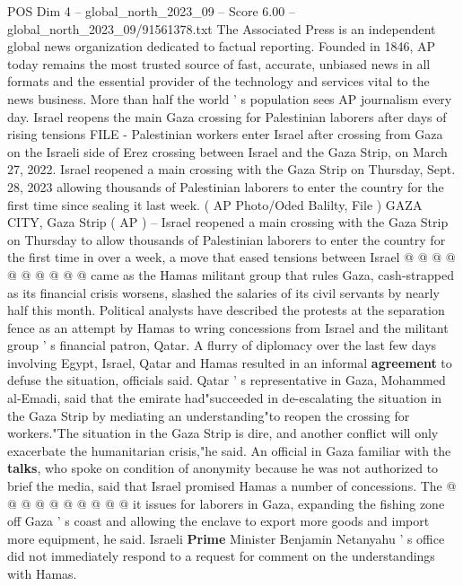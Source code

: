 \begin{textsample}{POS Dim 4 – global\_north\_2023\_09 – Score 6.00 – global\_north\_2023\_09/91561378.txt}  \label{ex:f4_pos_416}
The Associated Press is an independent global news organization dedicated to factual reporting.
Founded in 1846, AP today remains the most trusted source of fast, accurate, unbiased news in all formats and the essential provider of the technology and services vital to the news business.
More than half the world ' s population sees AP journalism every day.
Israel reopens the main Gaza crossing for Palestinian laborers after days of rising tensions FILE - Palestinian workers enter Israel after crossing from Gaza on the Israeli side of Erez crossing between Israel and the Gaza Strip, on March 27, 2022.
Israel reopened a main crossing with the Gaza Strip on Thursday, Sept. 28, 2023 allowing thousands of Palestinian laborers to enter the country for the first time since sealing it last week. ( AP Photo/Oded Balilty, File ) GAZA CITY, Gaza Strip ( AP ) -- Israel reopened a main crossing with the Gaza Strip on Thursday to allow thousands of Palestinian laborers to enter the country for the first time in over a week, a move that eased tensions between Israel @ @ @ @ @ @ @ @ @ @ came as the Hamas militant group that rules Gaza, cash-strapped as its financial crisis worsens, slashed the salaries of its civil servants by nearly half this month.
Political analysts have described the protests at the separation fence as an attempt by Hamas to wring concessions from Israel and the militant group ' s financial patron, Qatar.
A flurry of diplomacy over the last few days involving Egypt, Israel, Qatar and Hamas resulted in an informal \textbf{agreement} to defuse the situation, officials said.
Qatar ' s representative in Gaza, Mohammed al-Emadi, said that the emirate had"succeeded in de-escalating the situation in the Gaza Strip by mediating an understanding"to reopen the crossing for workers."The situation in the Gaza Strip is dire, and another conflict will only exacerbate the humanitarian crisis,"he said.
An official in Gaza familiar with the \textbf{talks}, who spoke on condition of anonymity because he was not authorized to brief the media, said that Israel promised Hamas a number of concessions.
The @ @ @ @ @ @ @ @ @ @ it issues for laborers in Gaza, expanding the fishing zone off Gaza ' s coast and allowing the enclave to export more goods and import more equipment, he said.
Israeli \textbf{Prime} Minister Benjamin Netanyahu ' s office did not immediately respond to a request for comment on the understandings with Hamas.

\end{textsample}
